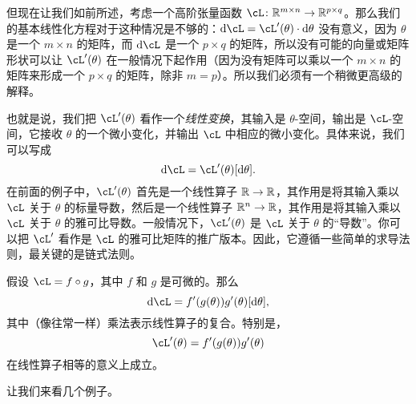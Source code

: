 \documentclass[../../book-main_zh.tex]{subfiles}
\begin{document}
但现在让我们如前所述，考虑一个高阶张量函数 \(\cL \colon \R^{m \times n} \to \R^{p \times q}\)。那么我们的基本线性化方程对于这种情况是不够的：\(\odif{\cL} = \cL^{\prime}(\theta) \cdot \odif{\theta}\) 没有意义，因为 \(\theta\) 是一个 \(m \times n\) 的矩阵，而 \(\odif{\cL}\) 是一个 \(p \times q\) 的矩阵，所以没有可能的向量或矩阵形状可以让 \(\cL^{\prime}(\theta)\) 在一般情况下起作用（因为没有矩阵可以乘以一个 \(m \times n\) 的矩阵来形成一个 \(p \times q\) 的矩阵，除非 \(m = p\)）。所以我们必须有一个稍微更高级的解释。

也就是说，我们把 \(\cL^{\prime}(\theta)\) 看作一个\textit{线性变换}，其输入是 \(\theta\)-空间，输出是 \(\cL\)-空间，它接收 \(\theta\) 的一个微小变化，并输出 \(\cL\) 中相应的微小变化。具体来说，我们可以写成
\begin{equation}
    \odif{\cL} = \cL^{\prime}(\theta)[\odif{\theta}].
\end{equation}
在前面的例子中，\(\cL^{\prime}(\theta)\) 首先是一个线性算子 \(\mathbb{R} \to \mathbb{R}\)，其作用是将其输入乘以 \(\cL\) 关于 \(\theta\) 的标量导数，然后是一个线性算子 \(\mathbb{R}^{n} \to \mathbb{R}\)，其作用是将其输入乘以 \(\cL\) 关于 \(\theta\) 的雅可比导数。一般情况下，\(\cL^{\prime}(\theta)\) 是 \(\cL\) 关于 \(\theta\) 的“导数”。你可以把 \(\cL^{\prime}\) 看作是 \(\cL\) 的雅可比矩阵的推广版本。因此，它遵循一些简单的求导法则，最关键的是链式法则。

\begin{theorem}[微分链式法则]
    假设 \(\cL = f \circ g\)，其中 \(f\) 和 \(g\) 是可微的。那么
    \begin{equation}
        \odif{\cL} = f^{\prime}(g(\theta))g^{\prime}(\theta)[\odif{\theta}],
    \end{equation}
    其中（像往常一样）乘法表示线性算子的复合。特别是，
    \begin{equation}
        \cL^{\prime}(\theta) = f^{\prime}(g(\theta))g^{\prime}(\theta)
    \end{equation}
    在线性算子相等的意义上成立。
\end{theorem}

让我们来看几个例子。
\end{document}
